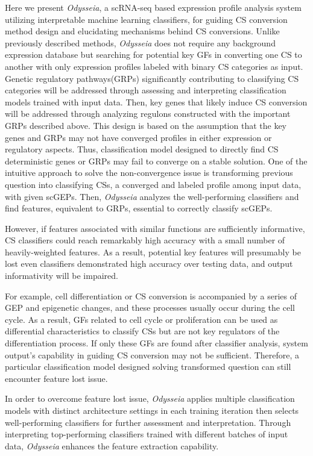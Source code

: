 \documentclass[fleqn,10pt]{wlscirep}
\begin{document}
Here we present \emph{Odysseia}, a scRNA-seq based expression profile analysis system utilizing interpretable machine learning classifiers, for  guiding CS conversion method design and elucidating mechanisms behind CS conversions.
Unlike previously described methods, \emph{Odysseia} does not require any background expression database but searching for potential key GFs in converting one CS to another with only expression profiles labeled with binary CS categories as input.
Genetic regulatory pathways(GRPs) significantly contributing to classifying CS categories will be addressed through assessing and interpreting classification models trained with input data.
Then, key genes that likely induce CS conversion will be addressed through analyzing regulons constructed with the important GRPs described above.
This design is based on the assumption that the key genes and GRPs may not have converged profiles in either expression or regulatory aspects.
Thus, classification model designed to directly find CS deterministic genes or GRPs may fail to converge on a stable solution.
One of the intuitive approach to solve the non-convergence issue is transforming previous question into classifying CSs, a converged and labeled profile among input data, with given scGEPs.
Then, \emph{Odysseia} analyzes the well-performing classifiers and find features, equivalent to GRPs, essential to correctly classify scGEPs.

However, if features associated with similar functions are sufficiently informative, CS classifiers could reach remarkably high accuracy with a small number of heavily-weighted features.
As a result, potential key features will presumably be lost even classifiers demonstrated high accuracy over testing data, and output informativity will be impaired.

For example, cell differentiation or CS conversion is accompanied by a series of GEP and epigenetic changes, and these processes usually occur during the cell cycle.\cite{dalton_2015, engstrom_2021}
As a result, GFs related to cell cycle or proliferation can be used as differential characteristics to classify CSs but are not key regulators of the differentiation process.
If only these GFs are found after classifier analysis, system output's capability in guiding CS conversion may not be sufficient.
Therefore, a particular classification model designed solving transformed question can still encounter feature lost issue.

In order to overcome feature lost issue, \emph{Odysseia} applies multiple classification models with distinct architecture settings in each training iteration then selects well-performing classifiers for further assessment and interpretation.
Through interpreting top-performing classifiers trained with different batches of input data, \emph{Odysseia} enhances the feature extraction capability.
\end{document}
